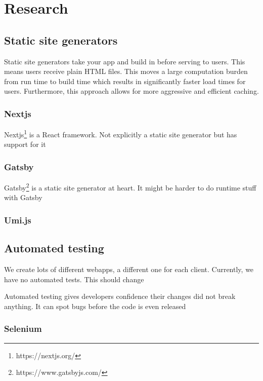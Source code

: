 \chapter{Research} %

\label{Chapter2} 


\section{Static site generators}

Static site generators take your app and build in before serving to users. 
This means users receive plain HTML files. This moves a large computation burden from run time to build time which results in significantly faster load times for users.
Furthermore, this approach allows for more aggressive and efficient caching.

\subsection{Nextjs}

Nextjs\footnote{https://nextjs.org/} is a React framework. Not explicitly a static site generator but has support for it

\subsection{Gatsby}

Gatsby\footnote{https://www.gatsbyjs.com/} is a static site generator at heart. It might be harder to do runtime stuff with Gatsby

\subsection{Umi.js}


\section{Automated testing}

We create lots of different webapps, a different one for each client. Currently, we have no automated tests. This should change

Automated testing gives developers confidence their changes did not break anything. It can spot bugs before the code is even released

\subsection{Selenium}


